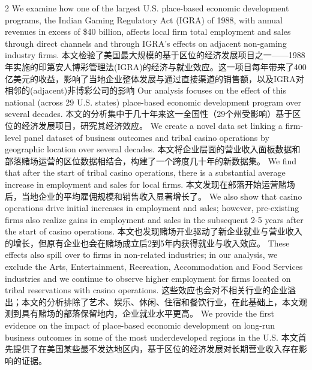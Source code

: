 \documentclass[cn,hazy,blue,14pt,screen]{elegantnote}
\begin{document}
\begin{paracol}{2}
	We examine how one of the largest U.S. place-based economic development programs, the Indian Gaming Regulatory Act (IGRA) of 1988, with annual revenues in excess of \$40 billion, affects local firm total employment and sales through direct channels and through IGRA's effects on adjacent non-gaming industry firms. 
	\switchcolumn
	本文检验了美国最大规模的基于区位的经济发展项目之一——1988年实施的印第安人博彩管理法(IGRA)的经济与就业效应。这一项目每年带来了400亿美元的收益，影响了当地企业整体发展与通过直接渠道的销售额，以及IGRA对相邻的(adjacent)非博彩公司的影响
	\switchcolumn*
	Our analysis focuses on the effect of this national (across 29 U.S. states) place-based economic development program over several decades. 
	\switchcolumn
	本文的分析集中于几十年来这一全国性（29个州受影响）基于区位的经济发展项目，研究其经济效应。
	\switchcolumn*
	We create a novel data set linking a firm-level panel dataset of business outcomes and tribal casino operations by geographic location over several decades. 
	\switchcolumn
	本文将企业层面的营业收入面板数据和部落赌场运营的区位数据相结合，构建了一个跨度几十年的新数据集。
	\switchcolumn*
	We find that after the start of tribal casino operations, there is a substantial average increase in employment and sales for local firms. 
	\switchcolumn
	本文发现在部落开始运营赌场后，当地企业的平均雇佣规模和销售收入显著增长了。
	\switchcolumn*
	We also show that casino operations drive initial increases in employment and sales; however, pre-existing firms also realize gains in employment and sales in the subsequent 2-5 years after the start of casino operations. 
	\switchcolumn
	本文也发现赌场开业驱动了新企业就业与营业收入的增长，但原有企业也会在赌场成立后2到5年内获得就业与收入效应。
	\switchcolumn*
	These effects also spill over to firms in non-related industries; in our analysis, we exclude the Arts, Entertainment, Recreation, Accommodation and Food Services industries and we continue to observe higher employment for firms located on tribal reservations with casino operations. 
	\switchcolumn
	这些效应也会对不相关行业的企业溢出；本文的分析排除了艺术、娱乐、休闲、住宿和餐饮行业，在此基础上，本文观测到具有赌场的部落保留地内，企业就业水平更高。
	\switchcolumn*
	We provide the first evidence on the impact of place-based economic development on long-run business outcomes in some of the most underdeveloped regions in the U.S.
	\switchcolumn
	本文首先提供了在美国某些最不发达地区内，基于区位的经济发展对长期营业收入存在影响的证据。
\end{paracol}
\end{document}
